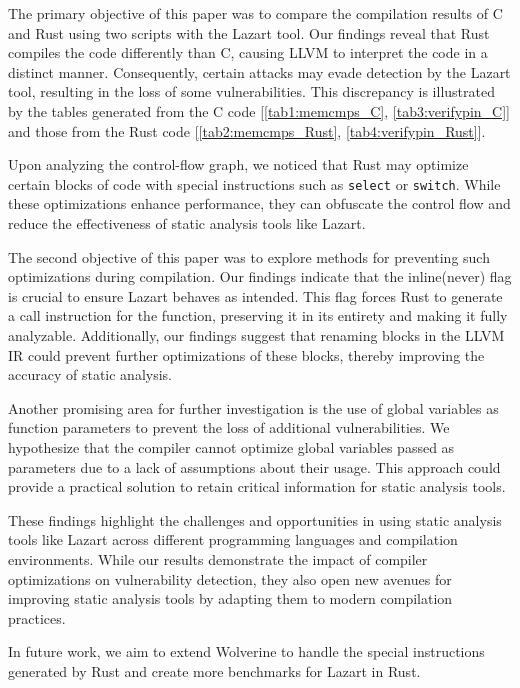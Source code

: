 \label{section:Conclusion}
The primary objective of this paper was to compare the compilation results of C and Rust using two scripts with the Lazart tool. Our findings reveal that Rust compiles the code differently than C, causing LLVM to interpret the code in a distinct manner. Consequently, certain attacks may evade detection by the Lazart tool, resulting in the loss of some vulnerabilities. This discrepancy is illustrated by the tables generated from the C code [\ref{tab1:memcmps_C}, \ref{tab3:verifypin_C}] and those from the Rust code [\ref{tab2:memcmps_Rust}, \ref{tab4:verifypin_Rust}].

Upon analyzing the control-flow graph, we noticed that Rust may optimize certain blocks of code with special instructions such as \texttt{select} or \texttt{switch}.
While these optimizations enhance performance, they can obfuscate the control flow and reduce the effectiveness of static analysis tools like Lazart.

The second objective of this paper was to explore methods for preventing such optimizations during compilation. Our findings indicate that the inline(never) flag is crucial to ensure Lazart behaves as intended. This flag forces Rust to generate a call instruction for the function, preserving it in its entirety and making it fully analyzable. Additionally, our findings suggest that renaming blocks in the LLVM IR could prevent further optimizations of these blocks, thereby improving the accuracy of static analysis.

Another promising area for further investigation is the use of global variables as function parameters to prevent the loss of additional vulnerabilities. We hypothesize that the compiler cannot optimize global variables passed as parameters due to a lack of assumptions about their usage. This approach could provide a practical solution to retain critical information for static analysis tools.

These findings highlight the challenges and opportunities in using static analysis tools like Lazart across different programming languages and compilation environments. While our results demonstrate the impact of compiler optimizations on vulnerability detection, they also open new avenues for improving static analysis tools by adapting them to modern compilation practices.

In future work, we aim to extend Wolverine to handle the special instructions generated by Rust and create more benchmarks for Lazart in Rust.


